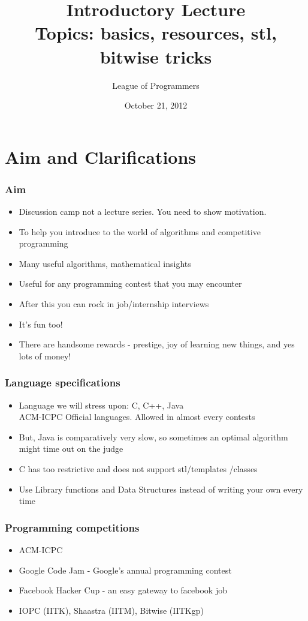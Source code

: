 \documentclass{beamer}
\title{Introductory Lecture \\
Topics: basics, resources, stl, bitwise tricks
}
\author{League of Programmers}
\institute{ACA, IIT Kanpur}
\date{October 21, 2012}
\begin{document}
\begin{frame}
  \titlepage
\end{frame}

\section{Aim and Clarifications}
\begin{frame}[<+->]
	\frametitle{Aim}

\begin{itemize}
\item{Discussion camp not a lecture series. You need to show motivation.}
\item{To help you introduce to the world of algorithms and competitive programming}
\item{Many useful algorithms, mathematical insights}
\item{Useful for any programming contest that you may encounter}
\item{After this you can rock in job/internship interviews}
\item{It's fun too!}
\item There are handsome rewards - prestige, joy of learning new things, and yes lots of money!
\end{itemize}

\end{frame}

\begin{frame}[<+->]
	\frametitle{Language specifications}

\begin{itemize}
\item{Language we will stress upon: C, C++, Java \\ ACM-ICPC Official languages. Allowed in almost every contests}
\item{But, Java is comparatively very slow, so sometimes an optimal algorithm might time out on the judge}
\item{C has too restrictive and does not support stl/templates /classes}
\item Use Library functions and Data Structures instead of writing your own every time
\end{itemize}
\end{frame}

\begin{frame}
	\frametitle{Programming competitions}

\begin{itemize}
\item{ACM-ICPC}
\pause 
\item{Google Code Jam - Google's annual programming contest}
\pause
\item{Facebook Hacker Cup - an easy gateway to facebook job}
\pause
\item{IOPC (IITK), Shaastra (IITM), Bitwise (IITKgp)}
\end{itemize}
\end{frame}
\end{document}
